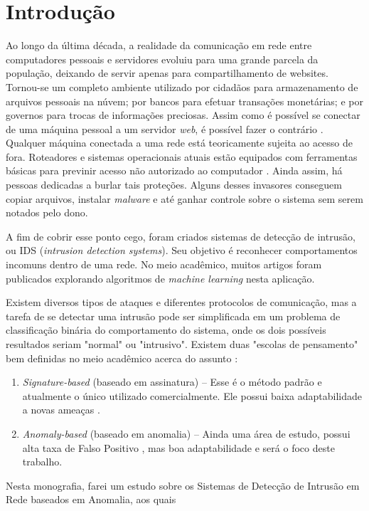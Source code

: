 \chapter{Introdução}
\label{ch:introducao}

Ao longo da última década, a realidade da comunicação em rede entre computadores pessoais e servidores evoluiu
para uma grande parcela da população, deixando de servir apenas para compartilhamento de websites.
Tornou-se um completo ambiente utilizado por cidadãos para armazenamento de arquivos pessoais na núvem;
por bancos para efetuar transações monetárias; e por governos para trocas de informações preciosas.
Assim como é possível se conectar de uma máquina pessoal a um servidor \textit{web}, é possível fazer o contrário \cite{tsai09}.
Qualquer máquina conectada a uma rede está teoricamente sujeita ao acesso de fora.
Roteadores e sistemas operacionais atuais estão equipados com ferramentas básicas para previnir acesso não autorizado
ao computador \cite{hongjuan10}. Ainda assim, há pessoas dedicadas a burlar tais proteções. Alguns desses invasores conseguem copiar
arquivos, instalar \textit{malware} e até ganhar controle sobre o sistema sem serem notados pelo dono.
\par A fim de cobrir esse ponto cego, foram criados sistemas de detecção de intrusão, ou IDS
(\textit{intrusion detection systems}). Seu objetivo é reconhecer comportamentos incomuns dentro de uma rede.
No meio acadêmico, muitos artigos foram publicados explorando algoritmos de \emph{machine learning} nesta aplicação.
\par Existem diversos tipos de ataques e diferentes protocolos de comunicação, mas a tarefa de se detectar uma
intrusão pode ser simplificada em um problema de classificação binária do comportamento do sistema, onde os dois
possíveis resultados seriam "normal" ou "intrusivo". Existem duas "escolas de pensamento" bem definidas no meio
acadêmico acerca do assunto \cite{tsai09}:
\begin{enumerate}
    \item \textit{Signature-based} (baseado em assinatura) -- Esse é o método padrão e atualmente o único utilizado
    comercialmente. Ele possui baixa adaptabilidade a novas ameaças \cite{davis11}.
    \item \textit{Anomaly-based} (baseado em anomalia) -- Ainda uma área de estudo, possui alta taxa de
    Falso Positivo \cite{catania12}, mas boa adaptabilidade e será o foco deste trabalho.
\end{enumerate}
\par Nesta monografia, farei um estudo sobre os Sistemas de Detecção de Intrusão em Rede baseados em Anomalia, aos quais
